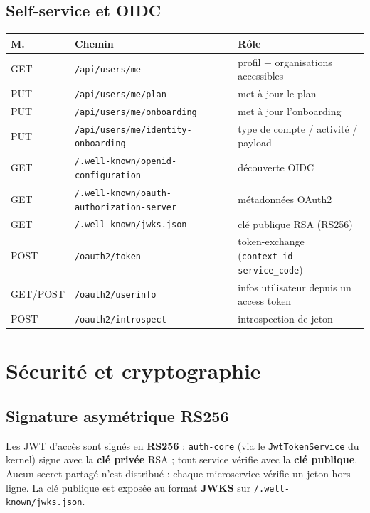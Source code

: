 \documentclass[11pt,a4paper,oneside]{report}
\newcommand{\code}[1]{\texttt{\small #1}}
\begin{document}
\section{Self-service et OIDC}
\begin{center}\small
\begin{longtable}{@{}p{1.2cm}p{6.6cm}p{5.5cm}@{}}
\toprule
\textbf{M.} & \textbf{Chemin} & \textbf{Rôle}\\
\midrule\endhead
GET & \code{/api/users/me} & profil + organisations accessibles\\
PUT & \code{/api/users/me/plan} & met à jour le plan\\
PUT & \code{/api/users/me/onboarding} & met à jour l'onboarding\\
PUT & \code{/api/users/me/identity-onboarding} & type de compte / activité / payload\\
GET & \code{/.well-known/openid-configuration} & découverte OIDC\\
GET & \code{/.well-known/oauth-authorization-server} & métadonnées OAuth2\\
GET & \code{/.well-known/jwks.json} & clé publique RSA (RS256)\\
POST & \code{/oauth2/token} & token-exchange (\code{context\_id} + \code{service\_code})\\
GET/POST & \code{/oauth2/userinfo} & infos utilisateur depuis un access token\\
POST & \code{/oauth2/introspect} & introspection de jeton\\
\bottomrule
\end{longtable}
\end{center}

\chapter{Sécurité et cryptographie}
\section{Signature asymétrique RS256}
Les JWT d'accès sont signés en \textbf{RS256} : \code{auth-core} (via le
\code{JwtTokenService} du kernel) signe avec la \textbf{clé privée} RSA ; tout service
vérifie avec la \textbf{clé publique}. Aucun secret partagé n'est distribué : chaque
microservice vérifie un jeton hors-ligne. La clé publique est exposée au format \textbf{JWKS}
sur \code{/.well-known/jwks.json}.
\end{document}
